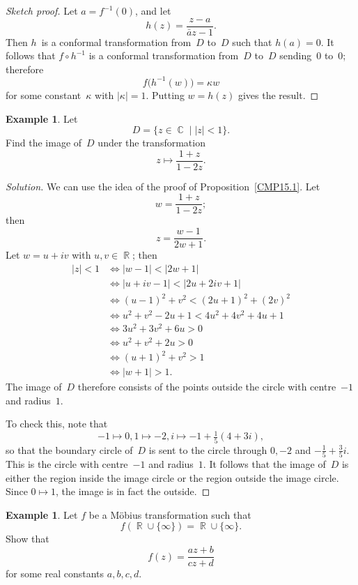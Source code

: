 \documentclass{amsproc}
\theoremstyle{definition}
\newtheorem{example}[theorem]{Example}
\newenvironment{solution}{\begin{proof}[Solution]}{\end{proof}}
\theoremstyle{remark}
\DeclareMathOperator{\R}{\mathbb{R}}
\DeclareMathOperator{\C}{\mathbb{C}}
\numberwithin{equation}{section}
\begin{document}
\begin{proof}[Sketch proof]
Let $ a = f^{-1}(0) $, and let
$$
h(z) = \dfrac{z - a}{\bar{a} z - 1}.
$$
Then $ h $~is a conformal transformation from~$ D $ to~$ D $ such that $ h(a) = 0 $. It follows that $ f \circ h^{-1} $ is a conformal transformation from~$ D $ to~$ D $
sending~$ 0 $ to~$ 0 $; therefore
$$
f\bigl(h^{-1}(w)\bigr) = \kappa w
$$
for some constant~$ \kappa $ with $ |\kappa| = 1 $. Putting $ w = h(z) $ gives the result.
\end{proof}

\begin{example} \label{CME15.4}
Let
$$
D = \{z \in \C \mid |z| < 1\}.
$$
Find the image of~$ D $ under the transformation
$$
z \mapsto \dfrac{1 + z}{1 - 2z}.
$$
\end{example}

\begin{solution}
We can use the idea of the proof of Proposition~\ref{CMP15.1}. Let
$$
w = \dfrac{1 + z}{1 - 2z};
$$
then
$$
z = \dfrac{w - 1}{2w + 1}.
$$
Let $ w = u + iv $ with $ u,v \in \R $; then
\begin{align*}
|z| < 1 &\iff |w - 1| < |2w + 1| \\
&\iff |u + iv - 1| < |2u + 2iv + 1| \\
&\iff (u - 1)^2 + v^2 < (2u + 1)^2 + (2v)^2 \\
&\iff u^2 + v^2 - 2u + 1 < 4u^2 + 4v^2 + 4u + 1 \\
&\iff 3u^2 + 3v^2 + 6u > 0 \\
&\iff u^2 + v^2 + 2u > 0 \\
&\iff (u + 1)^2 + v^2 > 1 \\
&\iff |w + 1| > 1.
\end{align*}
The image of~$ D $ therefore consists of the points outside the circle with centre~$ -1 $ and radius~$ 1 $.

To check this, note that
$$
-1 \mapsto 0, 1\mapsto -2, i \mapsto -1 + \tfrac{1}{5}(4 + 3i),
$$
so that the boundary circle of~$ D $ is sent to the circle through $ 0,-2 $ and $ -\tfrac{1}{5} + \tfrac{3}{5}i $. This is the circle with centre~$ -1 $ and radius~$ 1 $. It follows that
the image of~$ D $ is either the region inside the image circle or the region outside the image circle. Since $ 0 \mapsto 1 $, the image is in fact the outside.
\end{solution}

\begin{example} \label{CME15.5}
Let $ f $ be a M\"obius transformation such that
$$
f(\R \cup \{\infty\}) = \R \cup \{\infty\}.
$$
Show that
$$
f(z) = \dfrac{az + b}{cz + d}
$$
for some real constants $ a,b,c,d $.
\end{example}
\end{document}
